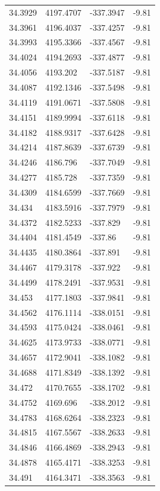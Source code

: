 \begin{table}[H]
\begin{tabular}{llll}
34.3929 & 4197.4707 & -337.3947 & -9.81 \\
34.3961 & 4196.4037 & -337.4257 & -9.81 \\
34.3993 & 4195.3366 & -337.4567 & -9.81 \\
34.4024 & 4194.2693 & -337.4877 & -9.81 \\
34.4056 & 4193.202 & -337.5187 & -9.81 \\
34.4087 & 4192.1346 & -337.5498 & -9.81 \\
34.4119 & 4191.0671 & -337.5808 & -9.81 \\
34.4151 & 4189.9994 & -337.6118 & -9.81 \\
34.4182 & 4188.9317 & -337.6428 & -9.81 \\
34.4214 & 4187.8639 & -337.6739 & -9.81 \\
34.4246 & 4186.796 & -337.7049 & -9.81 \\
34.4277 & 4185.728 & -337.7359 & -9.81 \\
34.4309 & 4184.6599 & -337.7669 & -9.81 \\
34.434 & 4183.5916 & -337.7979 & -9.81 \\
34.4372 & 4182.5233 & -337.829 & -9.81 \\
34.4404 & 4181.4549 & -337.86 & -9.81 \\
34.4435 & 4180.3864 & -337.891 & -9.81 \\
34.4467 & 4179.3178 & -337.922 & -9.81 \\
34.4499 & 4178.2491 & -337.9531 & -9.81 \\
34.453 & 4177.1803 & -337.9841 & -9.81 \\
34.4562 & 4176.1114 & -338.0151 & -9.81 \\
34.4593 & 4175.0424 & -338.0461 & -9.81 \\
34.4625 & 4173.9733 & -338.0771 & -9.81 \\
34.4657 & 4172.9041 & -338.1082 & -9.81 \\
34.4688 & 4171.8349 & -338.1392 & -9.81 \\
34.472 & 4170.7655 & -338.1702 & -9.81 \\
34.4752 & 4169.696 & -338.2012 & -9.81 \\
34.4783 & 4168.6264 & -338.2323 & -9.81 \\
34.4815 & 4167.5567 & -338.2633 & -9.81 \\
34.4846 & 4166.4869 & -338.2943 & -9.81 \\
34.4878 & 4165.4171 & -338.3253 & -9.81 \\
34.491 & 4164.3471 & -338.3563 & -9.81 \\

\end{tabular}
\end{table}
